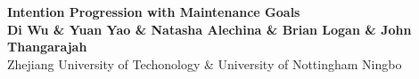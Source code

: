 \documentclass[a0, portrait]{a0poster}
\begin{document}


\begin{minipage}[b]{0.75\linewidth}
\veryHuge \color{NavyBlue} \textbf{Intention Progression with Maintenance Goals} \color{Black}\\ %
\huge \textbf{Di Wu \& Yuan Yao \& Natasha Alechina \& Brian Logan \& John Thangarajah}\\[0.5cm] %
\huge Zhejiang University of Techonology \& University of Nottingham Ningbo\\[0.4cm] %
\end{minipage}
%
\begin{minipage}[b]{0.25\linewidth}
\end{minipage}

\vspace{1cm} %

\end{document}
